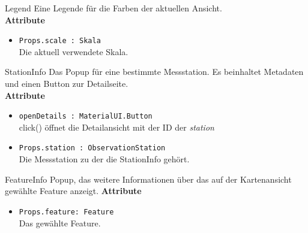     \begin{Class}{Legend}
        Eine Legende für die Farben der aktuellen Ansicht.
        \bigskip\\
        \textbf{Attribute}
        \begin{itemize}
            \item \texttt{Props.scale : Skala}
            \\ Die aktuell verwendete Skala.
        \end{itemize}
    \end{Class}
    
    \begin{Class}{StationInfo}
        Das Popup für eine bestimmte Messstation. Es beinhaltet Metadaten und einen Button zur Detailseite.
        \bigskip\\
        \textbf{Attribute}
        \begin{itemize}
            \item \texttt{openDetails : MaterialUI.Button}
            \\ click() öffnet die Detailansicht mit der ID der \emph{station}
            \item \texttt{Props.station : ObservationStation}
            \\ Die Messstation zu der die StationInfo gehört.
        \end{itemize}
    \end{Class}

    \begin{Class}{FeatureInfo}
        Popup, das weitere Informationen über das auf der \gls{Kartenansicht} gewählte Feature anzeigt.
        \textbf{Attribute}
        \begin{itemize}
            \item \texttt{Props.feature: Feature}
            \\Das gewählte Feature.
        \end{itemize}
    \end{Class}

